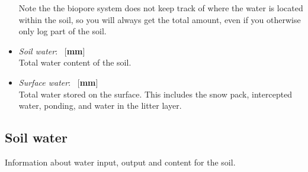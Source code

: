 \documentclass[a4paper]{article}
\begin{document}
\begin{itemize}
Note the the biopore system does not keep track of where the
water is located within the soil, so you will always get the
total amount, even if you otherwise only log part of the soil.
\item \textit{Soil water}: ~$[$\textbf{mm}$]$\\
Total water content of the soil.
\item \textit{Surface water}: ~$[$\textbf{mm}$]$\\
Total water stored on the surface.
This includes the snow pack, intercepted water, ponding, and water in
the litter layer.
\end{itemize}

\subsection{Soil water}

Information about water input, output and content for the soil.
\end{document}
